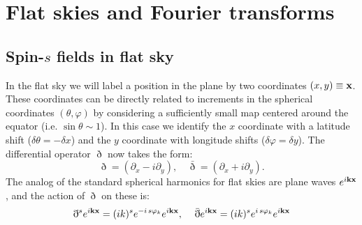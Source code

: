 \documentclass[usenatbib]{mnrasb}
\begin{document}
  \section{Flat skies and Fourier transforms}\label{app:flat}
    \subsection{Spin-\texorpdfstring{$s$}{s} fields in flat sky}\label{app:flat.fields}
      In the flat sky we will label a position in the plane by two coordinates $(x,y)\equiv{\bf x}$. These coordinates can be directly related to increments in the spherical coordinates $(\theta,\varphi)$ by considering a sufficiently small map centered around the equator (i.e. $\sin\theta\sim 1$). In this case we identify the $x$ coordinate with a latitude shift ($\delta\theta=-\delta x$) and the $y$ coordinate with longitude shifts ($\delta\varphi=\delta y$). The differential operator $\eth$ now takes the form:
      \begin{equation}
        \eth= (\partial_x-i\partial_y),\hspace{12pt}\bar{\eth}= (\partial_x+i\partial_y).
      \end{equation}
      The analog of the standard spherical harmonics for flat skies are plane waves $e^{i{\bf k}{\bf x}}$, and the action of $\eth$ on these is:
      \begin{equation}
        \eth^s e^{i{\bf k}{\bf x}}=(ik)^se^{-i\,s\varphi_k}e^{i{\bf k}{\bf x}},\hspace{12pt}
        \bar{\eth}e^{i{\bf k}{\bf x}}=(ik)^se^{i\,s\varphi_k}e^{i{\bf k}{\bf x}}
      \end{equation}
  
\end{document}
